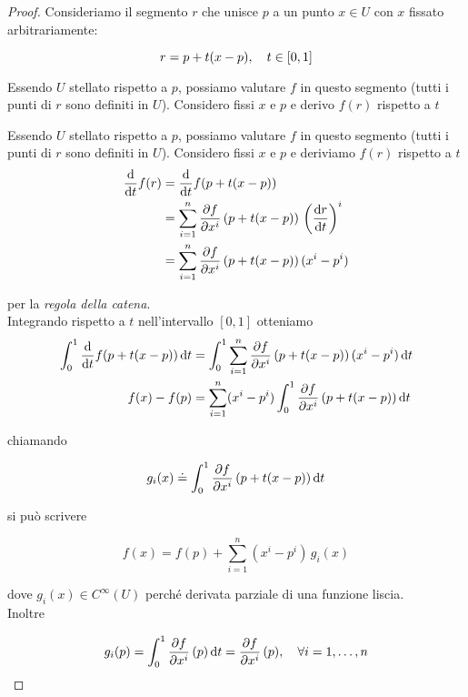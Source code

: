 \begin{proof}
	Consideriamo il segmento $ r $ che  unisce $ p $ a un punto $ x \in U $ con $ x $ fissato  arbitrariamente:
	
	\begin{equation}
		r=p+t(x-p) \qcomma t \in [0,1]
	\end{equation}
	
	Essendo $ U $ stellato rispetto a $ p $, possiamo valutare $ f $ in questo segmento (tutti i punti di $ r $ sono definiti in $ U $). Considero fissi $ x $ e $ p $ e derivo $ f(r) $ rispetto a $ t $
	
	Essendo $ U $ stellato rispetto a $ p $, possiamo valutare $ f $ in questo segmento (tutti i punti di $ r $ sono definiti in $ U $). Considero fissi $ x $ e $ p $ e deriviamo $ f(r) $ rispetto a $ t $
	\begin{align}
		\begin{split}
			\dv{t} f(r) &= \dv{t} f(p+t(x-p))\\
			&= \sum_{i=1}^{n} \pdv{f}{x^{i}} \, (p+t(x-p)) \, \left( \dv{r}{t} \right)^{i}\\
			&= \sum_{i=1}^{n} \pdv{f}{x^{i}} \, (p+t(x-p)) \, (x^{i}-p^{i})
		\end{split}
	\end{align}
	
	per la \textit{regola della catena}.\\
	
	Integrando rispetto a $ t $ nell'intervallo $ [0,1] $ otteniamo
	\begin{align}
		\begin{split}
			\int_{0}^{1} \dv{t} f(p+t(x-p)) \dd{t} &= \int_{0}^{1} \sum_{i=1}^{n} \pdv{f}{x^{i}} \, (p+t(x-p)) \, (x^{i}-p^{i}) \dd{t}\\
			f(x) - f(p)&= \sum_{i=1}^{n} (x^{i}-p^{i}) \int_{0}^{1} \pdv{f}{x^{i}} \, (p+t(x-p)) \dd{t}
		\end{split}
	\end{align}
	
	chiamando
	
	\begin{equation}
		g_{i}(x) \doteq \int_{0}^{1} \pdv{f}{x^{i}} \, (p+t(x-p)) \dd{t}
	\end{equation}
	
	si può scrivere
	
	\begin{equation}
		f(x)= f(p) + \sum_{i=1}^{n} (x^{i}-p^{i}) \, g_{i}(x)
	\end{equation}
	
	dove $ g_{i}(x) \in C^{\infty}(U) $ perché derivata parziale di una funzione liscia.\\
	Inoltre
	
	\begin{equation}
		g_{i}(p) = \int_{0}^{1} \pdv{f}{x^{i}} \, (p) \dd{t} = \pdv{f}{x^{i}} \, (p) \qcomma \forall i=1,\dots,n
	\end{equation}
\end{proof}

